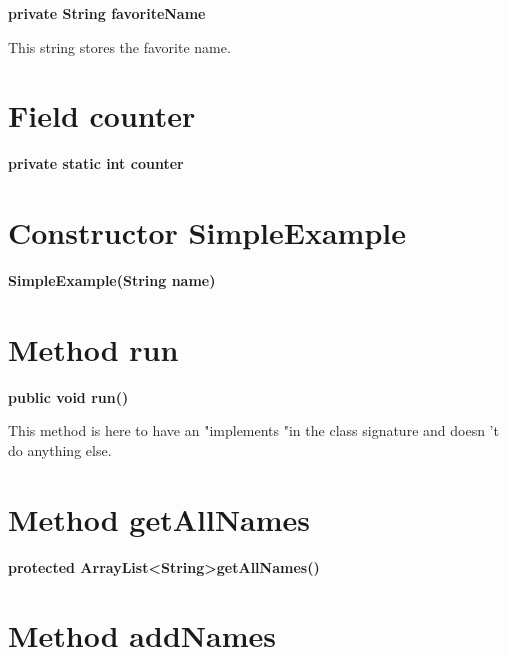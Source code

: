 \documentclass[12pt]{scrreprt}
\begin{document}
\textbf{private String favoriteName}


This string stores the favorite name.



\section{Field counter}
\label{examples.SimpleExample:counter}




\textbf{private static int counter}






\section{Constructor SimpleExample}
\label{examples.SimpleExample:SimpleExample}




\textbf{SimpleExample(String name)}








\section{Method run}
\label{examples.SimpleExample:run}




\textbf{public void run()}


This method is here to have an "implements "in the class signature and doesn 't do anything else.





\section{Method getAllNames}
\label{examples.SimpleExample:getAllNames}




\textbf{protected ArrayList\textless String\textgreater  getAllNames()}








\section{Method addNames}
\label{examples.SimpleExample:addNames}
\end{document}
